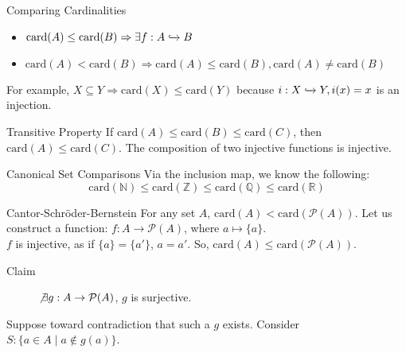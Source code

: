 \documentclass[8pt]{extarticle}
\begin{document}
  \begin{problem}{Comparing Cardinalities}
    \begin{itemize}
      \item $\textrm{card}(A) \leq \text{card}(B) \Rightarrow \exists f: A\xhookrightarrow{} B$ 
      \item $\text{card}(A) < \text{card}(B) \Rightarrow \text{card}(A) \leq \text{card}(B), \text{card}(A) \neq \textrm{card}(B)$
    \end{itemize}
    For example, $X\subseteq Y \Rightarrow \text{card}(X) \leq \text{card}(Y)$ because $i: X\xhookrightarrow{} Y, i(x) = x$ is an injection.\\

    \begin{problem}{Transitive Property}
      If $\text{card}(A) \leq \text{card}(B) \leq \text{card}(C)$, then $\text{card}(A) \leq \text{card}(C)$.
      \tcblower
      The composition of two injective functions is injective.
    \end{problem}
    \begin{problem}{Canonical Set Comparisons}
      Via the inclusion map, we know the following:
      \[
        \text{card}(\mathbb{N}) \leq \text{card}(\mathbb{Z}) \leq \text{card}(\mathbb{Q}) \leq \text{card}(\mathbb{R})
      \] 
    \end{problem}
    \begin{problem}{Cantor-Schröder-Bernstein}
      For any set $A$, $\text{card}(A) < \text{card}(\mathcal{P}(A))$.
      \tcblower
      Let us construct a function: $f: A \rightarrow \mathcal{P}(A)$, where $a \mapsto \{a\}$.\\

      $f$ is injective, as if $\{a\} = \{a'\}$, $a = a'$. So, $\text{card}(A) \leq \text{card}(\mathcal{P}(A))$.
      \begin{description}
        \item[Claim] $\not\exists g: A\rightarrow \mathcal{P}(A)$, $g$ is surjective.
      \end{description}
      Suppose toward contradiction that such a $g$ exists. Consider $S: \{a\in A \mid a\notin g(a)\}$.\\


\end{problem}
\end{problem}
\end{document}
